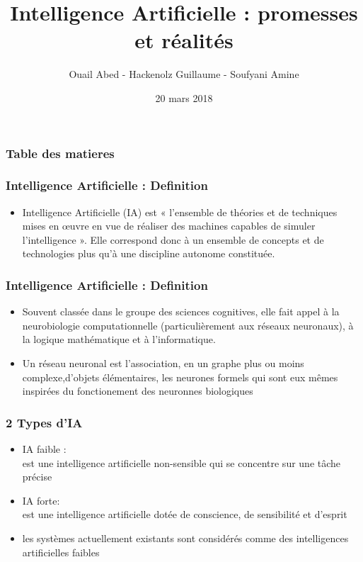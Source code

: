\documentclass{beamer}
\title{Intelligence Artificielle : promesses et réalités}
\author{Ouail Abed - Hackenolz Guillaume - Soufyani Amine}
\date{20 mars 2018}
\begin{document}
	\begin{frame}
	\titlepage
	\end{frame}
	
	\begin{frame} %
	\frametitle{Table des matieres}
	\tableofcontents[hideallsubsections] %
	\end{frame}

	
	\begin{frame}[fragile]
	\frametitle{Intelligence Artificielle : Definition}
	\begin{itemize}
		\item Intelligence Artificielle (IA)
		  est « l'ensemble de théories et de techniques mises en œuvre en vue de réaliser des machines     					  capables de simuler l'intelligence ». Elle correspond donc à un ensemble 	de concepts et de 						  technologies plus qu'à une discipline autonome constituée.
	\end{itemize}
	\end{frame}
	
	\begin{frame}[fragile]
	\frametitle{Intelligence Artificielle : Definition}
	\begin{itemize}
		\itemsep2em
		\item Souvent classée dans le groupe des sciences cognitives, elle fait appel à la neurobiologie 					computationnelle (particulièrement aux réseaux neuronaux), à la logique mathématique et à 							l'informatique. 
		
		\item Un réseau neuronal est l’association, en un graphe plus ou moins 															complexe,d’objets élémentaires, les neurones formels qui sont eux mêmes inspirées du fonctionement 		des neuronnes biologiques
	\end{itemize}
	\end{frame}
	
	
	\begin{frame}[fragile]
	\frametitle{2 Types d'IA}
	\begin{itemize}
		\itemsep0.5em
		\item IA faible  :\\
		est une intelligence artificielle non-sensible qui se concentre sur une tâche précise
		 
		 \item IA forte: \\
		est une intelligence artificielle dotée de conscience, de sensibilité et d'esprit
		\item les systèmes actuellement existants sont considérés comme des intelligences artificielles faibles
	\end{itemize}
	\end{frame}
	
\end{document}
